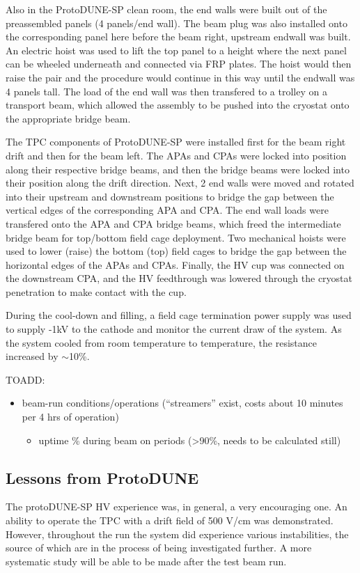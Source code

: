 Also in the ProtoDUNE-SP clean room, the end walls were built out of the preassembled panels (4 panels/end wall).
The beam plug was also installed onto the corresponding panel here before the beam right, upstream endwall was built.
An electric hoist was used to lift the top panel to a height where the next panel can be wheeled underneath and connected via FRP plates.
The hoist would then raise the pair and the procedure would continue in this way until the endwall was 4 panels tall.
The load of the end wall was then transfered to a trolley on a transport beam, which allowed the assembly to be pushed into the cryostat onto the appropriate bridge beam.

The TPC components of ProtoDUNE-SP were installed first for the beam right drift and then for the beam left.
The APAs and CPAs were locked into position along their respective bridge beams, and then the bridge beams were locked into their position along the drift direction.
Next, 2 end walls were moved and rotated into their upstream and downstream positions to bridge the gap between the vertical edges of the corresponding APA and CPA.
The end wall loads were transfered onto the APA and CPA bridge beams, which freed the intermediate bridge beam for top/bottom field cage deployment.
Two mechanical hoists were used to lower (raise) the bottom (top) field cages to bridge the gap between the horizontal edges of the APAs and CPAs.
Finally, the HV cup was connected on the downstream CPA, and the HV feedthrough was lowered through the cryostat penetration to make contact with the cup.

During the cool-down and  filling, a field cage termination power supply was used to supply -1kV to the cathode and monitor the current draw of the system.
As the system cooled from room temperature to  temperature, the resistance increased by $\sim$10\%.

TOADD:
\begin{itemize}
\item beam-run conditions/operations (``streamers'' exist, costs about 10 minutes per 4 hrs of operation)
\begin{itemize}
\item uptime \% during beam on periods (>90\%, needs to be calculated still)
\end{itemize}
\end{itemize}

\label{sec:fdsp-hv-protodune-summary}

\subsection{Lessons from ProtoDUNE}
\label{sec:fdsp-hv-protodune-lessons}
The protoDUNE-SP HV experience was, in general, a very encouraging one.
An ability to operate the TPC with a drift field of 500 V/cm was demonstrated.
However, throughout the run the system did experience various instabilities, the source of which are in the process of being investigated further.
A more systematic study will be able to be made after the test beam run.

